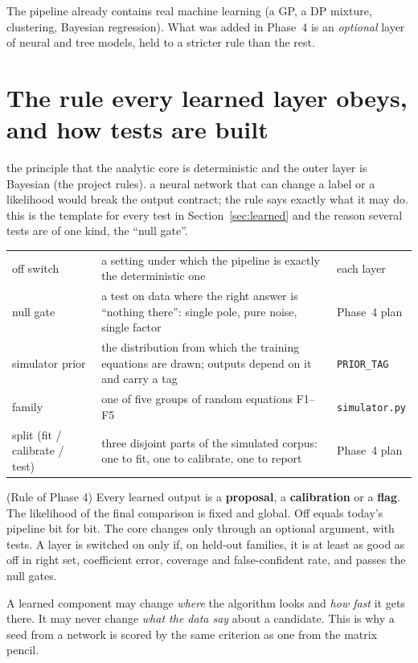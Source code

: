 \begin{takeaway}
The pipeline already contains real machine learning (a GP, a DP mixture, clustering, Bayesian regression). What was added in Phase~4 is an \emph{optional} layer of neural and tree models, held to a stricter rule than the rest.
\end{takeaway}

\section{The rule every learned layer obeys, and how tests are built}\label{sec:rule}
\sectionbrief
{the principle that the analytic core is deterministic and the outer layer is Bayesian (the project rules).}
{a neural network that can change a label or a likelihood would break the output contract; the rule says exactly what it may do.}
{this is the template for every test in Section~\ref{sec:learned} and the reason several tests are of one kind, the ``null gate''.}

\begin{symbols}
\begin{tabular}{@{}L{2.6cm}L{6.0cm}L{4.3cm}@{}}
off switch & a setting under which the pipeline is exactly the deterministic one & each layer\\
null gate & a test on data where the right answer is ``nothing there'': single pole, pure noise, single factor & Phase~4 plan\\
simulator prior & the distribution from which the training equations are drawn; outputs depend on it and carry a tag & \texttt{PRIOR\_TAG}\\
family & one of five groups of random equations F1--F5 & \texttt{simulator.py}\\
split (fit / calibrate / test) & three disjoint parts of the simulated corpus: one to fit, one to calibrate, one to report & Phase~4 plan\\
\end{tabular}
\end{symbols}

\begin{theorem}{(Rule of Phase 4) \impl}\label{thm:rule}
Every learned output is a \textbf{proposal}, a \textbf{calibration} or a \textbf{flag}. The likelihood of the final comparison is fixed and global. Off equals today's pipeline bit for bit. The core changes only through an optional argument, with tests. A layer is switched on only if, on held-out families, it is at least as good as off in right set, coefficient error, coverage and false-confident rate, and passes the null gates.
\end{theorem}
\begin{intuition}
A learned component may change \emph{where} the algorithm looks and \emph{how fast} it gets there. It may never change \emph{what the data say} about a candidate. This is why a seed from a network is scored by the same criterion as one from the matrix pencil.
\end{intuition}

